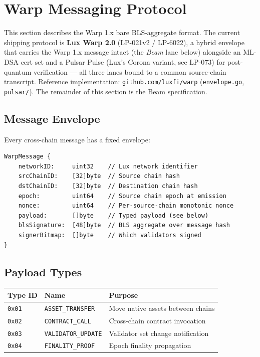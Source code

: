 \section{Warp Messaging Protocol}

This section describes the Warp 1.x bare BLS-aggregate format. The
current shipping protocol is \textbf{Lux Warp 2.0} (LP-021v2 /
LP-6022), a hybrid envelope that carries the Warp 1.x message intact
(the \emph{Beam} lane below) alongside an ML-DSA cert set and a
Pulsar Pulse (Lux's Corona variant, see LP-073) for post-quantum
verification --- all three lanes bound to a common source-chain
transcript. Reference implementation:
\texttt{github.com/luxfi/warp} (\texttt{envelope.go},
\texttt{pulsar/}). The remainder of this section is the Beam
specification.

\subsection{Message Envelope}

Every cross-chain message has a fixed envelope:

\begin{verbatim}
WarpMessage {
    networkID:     uint32    // Lux network identifier
    srcChainID:    [32]byte  // Source chain hash
    dstChainID:    [32]byte  // Destination chain hash
    epoch:         uint64    // Source chain epoch at emission
    nonce:         uint64    // Per-source-chain monotonic nonce
    payload:       []byte    // Typed payload (see below)
    blsSignature:  [48]byte  // BLS aggregate over message hash
    signerBitmap:  []byte    // Which validators signed
}
\end{verbatim}

\subsection{Payload Types}

\begin{center}
\begin{tabular}{lll}
\toprule
\textbf{Type ID} & \textbf{Name} & \textbf{Purpose} \\
\midrule
\texttt{0x01} & \texttt{ASSET\_TRANSFER} & Move native assets between chains \\
\texttt{0x02} & \texttt{CONTRACT\_CALL} & Cross-chain contract invocation \\
\texttt{0x03} & \texttt{VALIDATOR\_UPDATE} & Validator set change notification \\
\texttt{0x04} & \texttt{FINALITY\_PROOF} & Epoch finality propagation \\
\bottomrule
\end{tabular}
\end{center}

